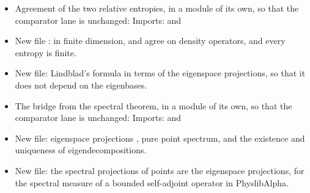 \documentclass[11pt]{article}
\begin{document}
\begin{itemize}
  Imports:  and\newline
  \newline
  (the latter for a density operator of infinite entropy).
\item Agreement of the two relative entropies, in a module of its own, so that the comparator lane
  is unchanged:\newline
  \newline
  Imports:  and\newline
\item New file : in finite
  dimension,  and  agree on density operators, and every
  entropy is finite.
\item New file:\newline {}\newline
  Lindblad's formula in terms of the eigenspace projections, so that it does not depend on the
  eigenbases.
\item The bridge from the spectral theorem, in a module of its own, so that the comparator lane
  is unchanged:\newline
  \newline
  Imports:  and\newline
\item New file:\newline {}\newline
  eigenspace projections , pure point spectrum, and the existence and uniqueness
  of eigendecompositions.
\item New file:\newline {}\newline
  the spectral projections of points are the eigenspace projections, for the spectral measure
   of a bounded self-adjoint operator in PhyslibAlpha.

\end{itemize}
\end{document}

